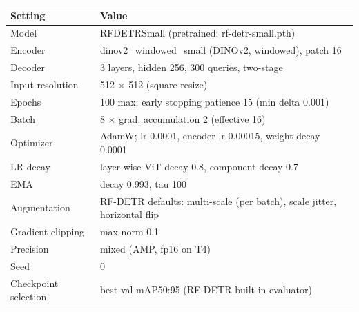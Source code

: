 \begin{tabular}{p{3.6cm}p{10.4cm}}
\toprule
Setting & Value \\
\midrule
Model & RFDETRSmall (pretrained: rf-detr-small.pth) \\
Encoder & dinov2\_windowed\_small (DINOv2, windowed), patch 16 \\
Decoder & 3 layers, hidden 256, 300 queries, two-stage \\
Input resolution & 512 $\times$ 512 (square resize) \\
Epochs & 100 max; early stopping patience 15 (min delta 0.001) \\
Batch & 8 $\times$ grad. accumulation 2 (effective 16) \\
Optimizer & AdamW; lr 0.0001, encoder lr 0.00015, weight decay 0.0001 \\
LR decay & layer-wise ViT decay 0.8, component decay 0.7 \\
EMA & decay 0.993, tau 100 \\
Augmentation & RF-DETR defaults: multi-scale (per batch), scale jitter, horizontal flip \\
Gradient clipping & max norm 0.1 \\
Precision & mixed (AMP, fp16 on T4) \\
Seed & 0 \\
Checkpoint selection & best val mAP50:95 (RF-DETR built-in evaluator) \\
\bottomrule
\end{tabular}
